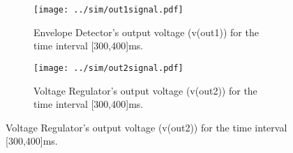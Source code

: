 \begin{figure}[H]
  \begin{subfigure}{.49\linewidth}
    \centering
    \texttt{[image: ../sim/out1signal.pdf]}
    \footnotesize
  \caption{Envelope Detector's output voltage (v(out1)) for the time interval [300,400]ms.}
   \label{fig:out1}
  \end{subfigure}
  \hspace{5mm}
  \begin{subfigure}{.49\linewidth}
    \centering
  \texttt{[image: ../sim/out2signal.pdf]}
  \caption{Voltage Regulator's output voltage (v(out2)) for the time interval [300,400]ms.}
  \label{fig:out2}
  \end{subfigure}
\end{figure}

